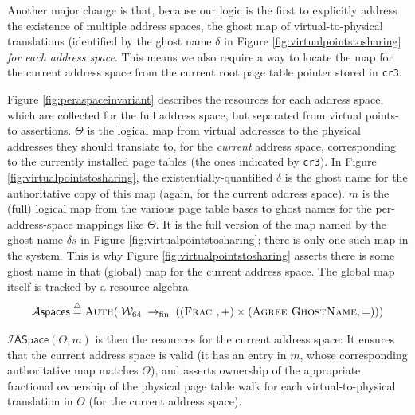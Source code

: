 Another major change is that, because our logic is the first to explicitly address the existence of multiple address spaces,
the ghost map of virtual-to-physical translations (identified by the ghost name $\delta$ in Figure \ref{fig:virtualpointstosharing}
 \emph{for each address space}. This means we also require a way to locate the map for the current address space
from the current root page table pointer stored in \lstinline|cr3|.

Figure \ref{fig:peraspaceinvariant} describes the resources for each address space, which are collected
for the full address space, but separated from virtual points-to assertions.
$\Theta$ is the logical map from virtual addresses to the physical addresses they should translate to, 
for the \emph{current} address space, corresponding to the currently installed page tables (the ones
indicated by \lstinline|cr3|). In Figure \ref{fig:virtualpointstosharing}, the existentially-quantified $\delta$
is the ghost name for the authoritative copy of this map (again, for the current address space).
$m$ is the (full) logical map from the various page table bases to ghost names for the 
per-address-space mappings like $\Theta$.
It is the full version of the map named by the ghost name $\delta{}s$ in
Figure \ref{fig:virtualpointstosharing}; there is only one such map in the system.
This is why Figure \ref{fig:virtualpointstosharing} asserts there is some ghost name in that (global) map
for the current address space.
The global map itself is tracked by a resource algebra 
\[\mathcal{A}\textsf{spaces} \stackrel{\triangle}{=} \textsc{Auth} (\; \mathcal{W}_{64} \;\rightarrow_{\textrm{fin}} \;  ( (\textsc{Frac }, \mathord{+}) \times (\textsc{Agree } \textsc{GhostName},\mathord{=}) )) \]


$\mathcal{I}\textsf{ASpace}(\Theta,m)$ is then the resources for the current address space:
It ensures that the current address space is valid (it has an entry in $m$, whose corresponding
authoritative map matches $\Theta$), and asserts ownership of the appropriate fractional ownership
of the physical page table walk for each virtual-to-physical translation in $\Theta$ (for the current address space).



